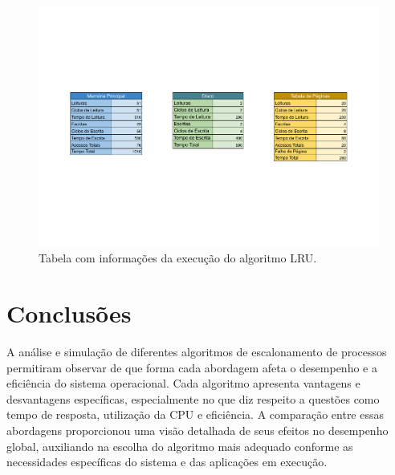 \documentclass[
	12pt,				%
	oneside,   	        %
	a4paper,			%
	english,			%
	french,				%
	spanish,			%
	brazil,				%
	]{pacotes/abntex2}
\begin{document}
\begin{figure}[H]
  \centering
  \includegraphics[scale=0.5]{figuras/LRU-TLB(none).pdf}
  \caption{Tabela com informações da execução do algoritmo LRU.}
  \label{fig:lru}
\end{figure}

\section{Conclusões}
\label{sec:conclusoes}
A análise e simulação de diferentes algoritmos de escalonamento de processos permitiram observar de que forma cada abordagem afeta o desempenho e a eficiência do sistema operacional. Cada algoritmo apresenta vantagens e desvantagens específicas, especialmente no que diz respeito a questões como tempo de resposta, utilização da CPU e eficiência. A comparação entre essas abordagens proporcionou uma visão detalhada de seus efeitos no desempenho global, auxiliando na escolha do algoritmo mais adequado conforme as necessidades específicas do sistema e das aplicações em execução.

\postextual
\renewcommand{\bibsection}{%
\section{\bibname}
\bibmark
\prebibhook}


\end{document}
